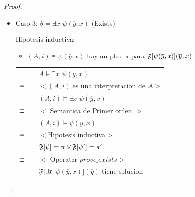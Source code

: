 \begin{proof}
\begin{itemize}
\begin{itemize}
				\item Caso 3: $\theta = \exists x$ $ \psi(\overline{y},x)$ (Exists)
					  
					  Hipotesis inductiva:
					 	\begin{itemize}
					 		\item $(A,i) \models \psi(\overline{y},x)$ hay un plan $\pi$ para $\mathfrak{F}[\psi(\overline{y},x)] (\overline{y},x)$
					 	\end{itemize}
				
					\begin{tabular}{@{}p{1mm}p{1mm}p{11cm}}	
					 	& & $A \models \exists x$ $ \psi(\overline{y},x)$\\
						$\equiv$ & & $<(A,i)$ es una interpretacion de $\mathcal{A}>$ \\
						& & $(A,i) \models \exists x$ $ \psi(\overline{y},x)$ \\
						$\equiv$ & & $<$ Semantica de Primer orden $>$\\
						& & $(A,i) \models \psi(\overline{y},x)$ \\
						$\equiv$ & & $<$Hipotesis inductiva$>$\\
						& & $\mathfrak{F}[\psi] = \pi \lor \mathfrak{F}[\psi'] = \pi'$\\
						$\equiv$ & & $<$ Operator $ prove\_exists >$\\
						& & $\mathfrak{F}[\exists x$ $ \psi(\overline{y},x)](\overline{y})$ tiene solucion
					\end{tabular}

			\end{itemize}
		
	\end{itemize}
\end{proof}
